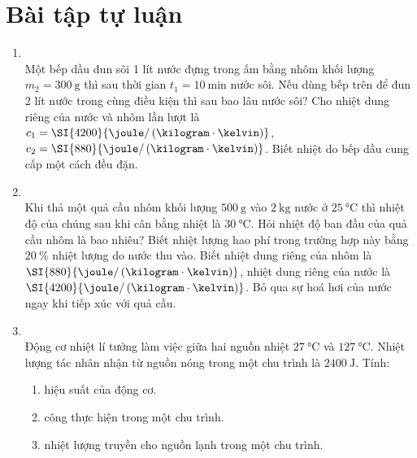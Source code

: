 \section{Bài tập tự luận}
\begin{enumerate}[label=\bfseries Câu \arabic*:, leftmargin=1.7cm]
	\item {}\\
	Một bếp dầu đun sôi 1 lít nước đựng trong ấm bằng nhôm khối lượng $m_2=\SI{300}{\gram}$ thì sau thời gian $t_1=\SI{10}{\minute}$ nước sôi. Nếu dùng bếp trên để đun 2 lít nước trong cùng điều kiện thì sau bao lâu nước sôi? Cho nhiệt dung riêng của nước và nhôm lần lượt là $c_1=\SI{4200}{\joule/\left(\kilogram\cdot\kelvin\right)}$, $c_2=\SI{880}{\joule/\left(\kilogram\cdot\kelvin\right)}$. Biết nhiệt do bếp dầu cung cấp một cách đều đặn.
	
\item	{}\\
Khi thả một quả cầu nhôm khối lượng $\SI{500}{\gram}$ vào $\SI{2}{\kilogram}$ nước ở $\SI{25}{\celsius}$ thì nhiệt độ của chúng sau khi cân bằng nhiệt là $\SI{30}{\celsius}$. Hỏi nhiệt độ ban đầu của quả cầu nhôm là bao nhiêu? Biết nhiệt lượng hao phí trong trường hợp này bằng $\SI{20}{\percent}$ nhiệt lượng do nước thu vào. Biết nhiệt dung riêng của nhôm là $\SI{880}{\joule/\left(\kilogram\cdot\kelvin\right)}$, nhiệt dung riêng của nước là $\SI{4200}{\joule/\left(\kilogram\cdot\kelvin\right)}$. Bỏ qua sự hoá hơi của nước ngay khi tiếp xúc với quả cầu.

\item {}\\
Động cơ nhiệt lí tưởng làm việc giữa hai nguồn nhiệt $\SI{27}{\celsius}$ và $\SI{127}{\celsius}$. Nhiệt lượng tác nhân nhận từ nguồn nóng trong một chu trình là $\SI{2400}{\joule}$. Tính:
\begin{enumerate}[label=\alph*)]
	\item hiệu suất của động cơ.
	\item công thực hiện trong một chu trình.
	\item nhiệt lượng truyền cho nguồn lạnh trong một chu trình.
\end{enumerate}


\end{enumerate}
